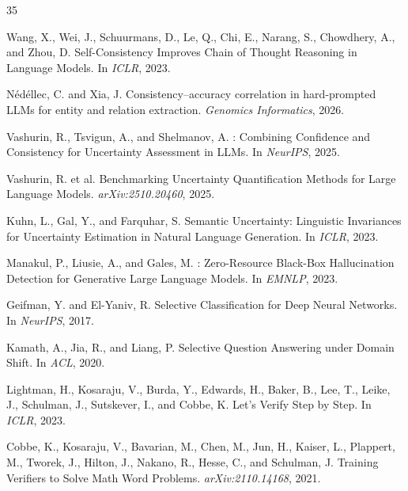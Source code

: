 \documentclass[11pt,a4paper]{article}
\begin{document}

\begin{thebibliography}{35}

Wang, X., Wei, J., Schuurmans, D., Le, Q., Chi, E., Narang, S., Chowdhery, A., and Zhou, D.
\newblock Self-Consistency Improves Chain of Thought Reasoning in Language Models.
\newblock In \emph{ICLR}, 2023.

N\'{e}d\'{e}llec, C. and Xia, J.
\newblock Consistency--accuracy correlation in hard-prompted {LLMs} for entity and relation extraction.
\newblock \emph{Genomics Informatics}, 2026.

Vashurin, R., Tsvigun, A., and Shelmanov, A.
: Combining Confidence and Consistency for Uncertainty Assessment in {LLMs}.
\newblock In \emph{NeurIPS}, 2025.

Vashurin, R. et al.
\newblock Benchmarking Uncertainty Quantification Methods for Large Language Models.
\newblock \emph{arXiv:2510.20460}, 2025.

Kuhn, L., Gal, Y., and Farquhar, S.
\newblock Semantic Uncertainty: Linguistic Invariances for Uncertainty Estimation in Natural Language Generation.
\newblock In \emph{ICLR}, 2023.

Manakul, P., Liusie, A., and Gales, M.
: Zero-Resource Black-Box Hallucination Detection for Generative Large Language Models.
\newblock In \emph{EMNLP}, 2023.

Geifman, Y. and El-Yaniv, R.
\newblock Selective Classification for Deep Neural Networks.
\newblock In \emph{NeurIPS}, 2017.

Kamath, A., Jia, R., and Liang, P.
\newblock Selective Question Answering under Domain Shift.
\newblock In \emph{ACL}, 2020.

Lightman, H., Kosaraju, V., Burda, Y., Edwards, H., Baker, B., Lee, T., Leike, J., Schulman, J., Sutskever, I., and Cobbe, K.
\newblock Let's Verify Step by Step.
\newblock In \emph{ICLR}, 2023.

Cobbe, K., Kosaraju, V., Bavarian, M., Chen, M., Jun, H., Kaiser, L., Plappert, M., Tworek, J., Hilton, J., Nakano, R., Hesse, C., and Schulman, J.
\newblock Training Verifiers to Solve Math Word Problems.
\newblock \emph{arXiv:2110.14168}, 2021.


\end{thebibliography}
\end{document}
